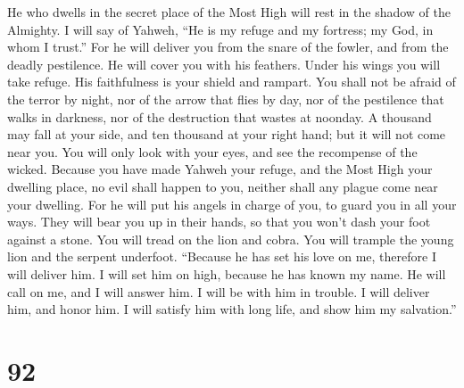  He who dwells in the secret place of the Most High will
rest in the shadow of the Almighty.  I will say of Yahweh,
``He is my refuge and my fortress; my God, in whom I trust.''
 For he will deliver you from the snare of the fowler, and
from the deadly pestilence.  He will cover you with his
feathers. Under his wings you will take refuge. His faithfulness is your
shield and rampart.  You shall not be afraid of the terror
by night, nor of the arrow that flies by day,  nor of the
pestilence that walks in darkness, nor of the destruction that wastes at
noonday.  A thousand may fall at your side, and ten thousand
at your right hand; but it will not come near you.  You will
only look with your eyes, and see the recompense of the wicked.
 Because you have made Yahweh your refuge, and the Most High
your dwelling place,  no evil shall happen to you, neither
shall any plague come near your dwelling.  For he will put
his angels in charge of you, to guard you in all your ways.
 They will bear you up in their hands, so that you won't
dash your foot against a stone.  You will tread on the lion
and cobra. You will trample the young lion and the serpent underfoot.
 ``Because he has set his love on me, therefore I will
deliver him. I will set him on high, because he has known my name.
 He will call on me, and I will answer him. I will be with
him in trouble. I will deliver him, and honor him.  I will
satisfy him with long life, and show him my salvation.''

\hypertarget{section-82}{%
\section{92}\label{section-82}}

